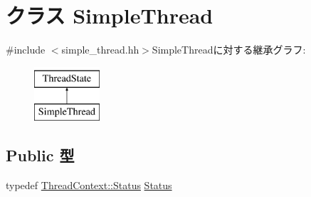 \hypertarget{classSimpleThread}{
\section{クラス SimpleThread}
\label{classSimpleThread}
}


{\ttfamily \#include $<$simple\_\-thread.hh$>$}SimpleThreadに対する継承グラフ:\begin{figure}[H]
\begin{center}
\leavevmode
\includegraphics[height=2cm]{classSimpleThread}
\end{center}
\end{figure}
\subsection*{Public 型}
\begin{DoxyCompactItemize}
\item 
typedef \hyperlink{classThreadContext_a67a0db04d321a74b7e7fcfd3f1a3f70b}{ThreadContext::Status} \hyperlink{classSimpleThread_a3af29dcea6d2bbb0a1de56f02ec789f1}{Status}
\end{DoxyCompactItemize}
